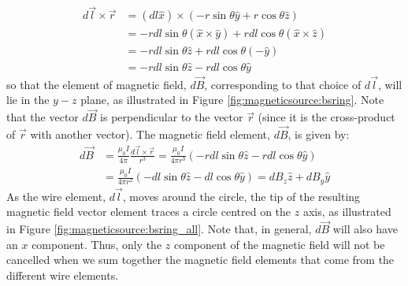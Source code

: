 \begin{align*}
d\vec l \times \vec r &= (dl \hat x) \times ( - r\sin\theta \hat y+r\cos\theta \hat z)\\
&=-rdl\sin\theta (\hat x \times \hat y) + rdl\cos\theta (\hat x \times \hat z)\\
&=-rdl\sin\theta\hat z + rdl\cos\theta (-\hat y)\\
&=-rdl\sin\theta\hat z - rdl\cos\theta \hat y 
\end{align*}
so that the element of magnetic field, $d\vec B$, corresponding to that choice of $d\vec l$, will lie in the $y-z$ plane, as illustrated in Figure \ref{fig:magneticsource:bsring}. Note that the vector $d\vec B$ is perpendicular to the vector $\vec r$ (since it is the cross-product of $\vec r$ with another vector). The magnetic field element, $d\vec B$, is given by:
\begin{align*}
d\vec B &= \frac{\mu_0 I}{4\pi}\frac{d\vec l\times \vec r}{r^3}= \frac{\mu_0 I}{4\pi r^3}(-rdl\sin\theta\hat z - rdl\cos\theta \hat y )\\
&=\frac{\mu_0 I}{4\pi r^2}(-dl\sin\theta \hat z - dl\cos\theta \hat y)=dB_z\hat z + dB_y \hat y
\end{align*}
As the wire element, $d\vec l$, moves around the circle, the tip of the resulting magnetic field vector element traces a circle centred on the $z$ axis, as illustrated in Figure \ref{fig:magneticsource:bsring_all}. Note that, in general, $d\vec B$ will also have an $x$ component. Thus, only the $z$ component of the magnetic field will not be cancelled when we sum together the magnetic field elements that come from the different wire elements.


